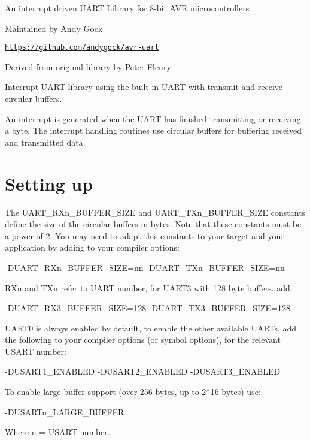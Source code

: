 An interrupt driven U\-A\-R\-T Library for 8-\/bit A\-V\-R microcontrollers

Maintained by Andy Gock

\href{https://github.com/andygock/avr-uart}{\tt https\-://github.\-com/andygock/avr-\/uart}

Derived from original library by Peter Fleury

Interrupt U\-A\-R\-T library using the built-\/in U\-A\-R\-T with transmit and receive circular buffers.

An interrupt is generated when the U\-A\-R\-T has finished transmitting or receiving a byte. The interrupt handling routines use circular buffers for buffering received and transmitted data.

\section*{Setting up}

The {\ttfamily U\-A\-R\-T\-\_\-\-R\-Xn\-\_\-\-B\-U\-F\-F\-E\-R\-\_\-\-S\-I\-Z\-E} and {\ttfamily U\-A\-R\-T\-\_\-\-T\-Xn\-\_\-\-B\-U\-F\-F\-E\-R\-\_\-\-S\-I\-Z\-E} constants define the size of the circular buffers in bytes. Note that these constants must be a power of 2. You may need to adapt this constants to your target and your application by adding to your compiler options\-: \begin{DoxyVerb}    -DUART_RXn_BUFFER_SIZE=nn -DUART_TXn_BUFFER_SIZE=nn
\end{DoxyVerb}


{\ttfamily R\-Xn} and {\ttfamily T\-Xn} refer to U\-A\-R\-T number, for U\-A\-R\-T3 with 128 byte buffers, add\-: \begin{DoxyVerb}    -DUART_RX3_BUFFER_SIZE=128 -DUART_TX3_BUFFER_SIZE=128
\end{DoxyVerb}


U\-A\-R\-T0 is always enabled by default, to enable the other available U\-A\-R\-Ts, add the following to your compiler options (or symbol options), for the relevant U\-S\-A\-R\-T number\-: \begin{DoxyVerb}    -DUSART1_ENABLED -DUSART2_ENABLED -DUSART3_ENABLED
\end{DoxyVerb}


To enable large buffer support (over 256 bytes, up to 2$^\wedge$16 bytes) use\-: \begin{DoxyVerb}    -DUSARTn_LARGE_BUFFER
\end{DoxyVerb}


Where n = U\-S\-A\-R\-T number.

